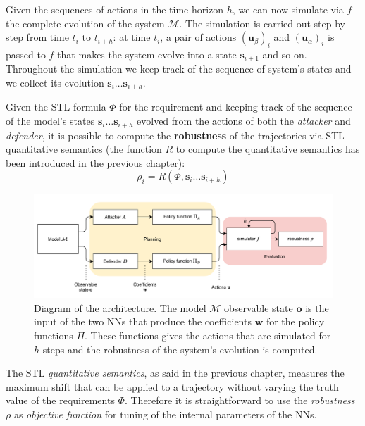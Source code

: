 Given the sequences of actions in the time horizon $h$, we can now simulate via $f$ the complete evolution of the system $\mathcal{M}$.
The simulation is carried out step by step from time $t_i$ to $t_{i + h}$: at time $t_i$, a pair of actions $(\textbf{u}_\beta)_i$ and $(\textbf{u}_\alpha)_i$ is passed to $f$ that makes the system evolve into a state $\textbf{s}_{i+1}$ and so on.
Throughout the simulation we keep track of the sequence of system's states and we collect its evolution $\textbf{s}_i \dots \textbf{s}_{i + h}$.

Given the STL formula $\Phi$ for the requirement and keeping track of the sequence of the model's states $\textbf{s}_i \dots \textbf{s}_{i + h}$ evolved from the actions of both the \textit{attacker} and \textit{defender}, it is possible to compute the \textbf{robustness} of the trajectories via STL {quantitative semantics} (the function $R$ to compute the quantitative semantics has been introduced in the previous chapter):
$$ \rho_i = R(\Phi, \textbf{s}_i \dots \textbf{s}_{i + h}) $$

\begin{figure}[H]
	\centering
	\includegraphics[width=14cm, keepaspectratio]{img/3_1_architecture.png}
	\caption{Diagram of the architecture. The model $\mathcal{M}$ observable state $\textbf{o}$ is the input of the two NNs that produce the coefficients $\textbf{w}$ for the policy functions $\Pi$. These functions gives the actions that are simulated for $h$ steps and the robustness of the system's evolution is computed.}
\end{figure}

The STL \textit{quantitative semantics}, as said in the previous chapter, measures the maximum shift that can be applied to a trajectory without varying the truth value of the requirements $\Phi$.
Therefore it is straightforward to use the \textit{robustness} $\rho$ as \textit{objective function} for tuning of the internal parameters of the NNs.


